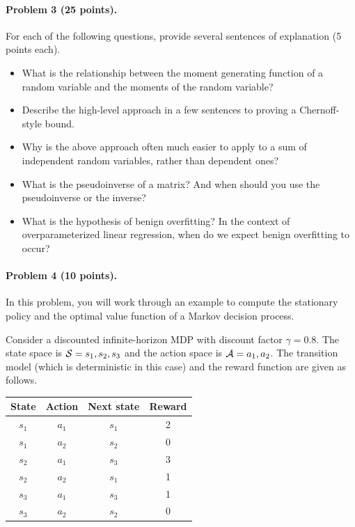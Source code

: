 \documentclass[11pt]{article}
\begin{document}
\paragraph{Problem 3 (25 points).}
For each of the following questions, provide several sentences of explanation (5 points each).
\begin{itemize}
    \item What is the relationship between the moment generating function of a random variable and the moments of the random variable?

    \item Describe the high-level approach in a few sentences to proving a Chernoff-style bound.

    \item Why is the above approach often much easier to apply to a sum of independent random variables, rather than dependent ones?

    \item What is the pseudoinverse of a matrix? And when should you use the pseudoinverse or the inverse?

    \item What is the hypothesis of benign overfitting? In the context of overparameterized linear regression, when do we expect benign overfitting to occur?
\end{itemize}

\newpage
\paragraph{Problem 4 (10 points).}
In this problem, you will work through an example to compute the stationary policy and the optimal value function of a Markov decision process.

Consider a discounted infinite-horizon MDP with discount factor $\gamma = 0.8$.
The state space is $\mathcal{S} = {s_1, s_2, s_3}$ and the action space is $\mathcal{A} = {a_1, a_2}$.
The transition model (which is deterministic in this case) and the reward function are given as follows.
\begin{table}[h]
\centering
\begin{tabular}{c|c|c|c}
\toprule
State & Action & Next state & Reward \\
\hline
$s_1$ & $a_1$ & $s_1$ & 2 \\
$s_1$ & $a_2$ & $s_2$  & 0 \\
$s_2$ & $a_1$ & $s_3$ & 3 \\
$s_2$ & $a_2$ & $s_1$  & 1 \\
$s_3$ & $a_1$ & $s_3$  & 1 \\
$s_3$ & $a_2$ & $s_2$ & 0 \\
\bottomrule
\end{tabular}
\end{table}
\end{document}
